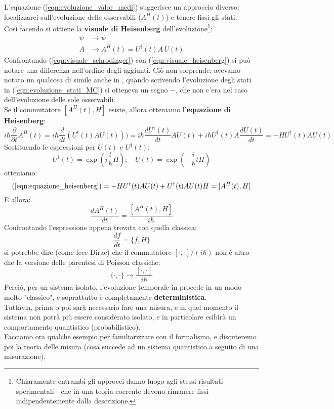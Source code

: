 \documentclass[../../FisicaTeorica.tex]{subfiles}
\begin{document}
L'equazione (\ref{eqn:evoluzione_valor_medi}) suggerisce un approccio diverso: focalizzarci sull'evoluzione delle osservabili ($A^H(t)$) e tenere fissi gli stati.\\
Così facendo si ottiene la \textbf{visuale di Heisenberg} dell'evoluzione\footnote{Chiaramente entrambi gli approcci danno luogo agli stessi risultati sperimentali - che in una teoria coerente devono rimanere fissi indipendentemente dalla descrizione.}:
\begin{align}
    \psi &\to \psi
    \label{eqn:visuale_heisenberg}
    \\
    A &\to A^H(t)=U^\dag (t)A\,U(t)
    \nonumber
\end{align}
Confrontando (\ref{eqn:visuale_schrodinger}) con (\ref{eqn:visuale_heisenberg}) si può notare una differenza nell'ordine degli aggiunti. Ciò non sorprende: avevamo notato un qualcosa di simile anche in \MC, quando scrivendo l'evoluzione degli stati in (\ref{eqn:evoluzione_stati_MC}) si otteneva un segno $-$, che non c'era nel caso dell'evoluzione delle sole osservabili.\\
Se il commutatore $[A^H(t), H]$ esiste, allora otteniamo l'\textbf{equazione di Heisenberg}:
\begin{equation}
i\hbar \frac{\partial}{\partial t}A^H(t) = i\hbar \frac{d}{dt}(U^t(t)AU(t))
) = i\hbar \frac{dU^\dag(t)}{dt}AU(t)+i\hbar U^\dag(t)A\frac{dU(t)}{dt} = -HU^\dag(t)AU(t)
\label{eqn:equazione_heisenberg}
\end{equation}
Sostituendo le espressioni per $U(t)$ e $U^\dag(t)$:
\[
U^\dag(t)=\exp\left(i\frac{t}{\hbar}H\right); \quad U(t)=\exp\left(-\frac{i}{\hbar}tH\right)
\]
otteniamo:
\[
(\ref{eqn:equazione_heisenberg}) = -HU^\dag(t)AU(t)+U^\dag(t)AU(t)H=[A^H(t),H]
\]
E allora:
\[
\frac{dA^H(t)}{dt}=\frac{[A^H(t),H]}{i\hbar}
\]
Confrontando l'espressione appena trovata con quella classica:
\[
\frac{df}{dt}=\{f,H\}
\]
si potrebbe dire (come fece Dirac) che il commutatore $[\cdot,\cdot]/(i\hbar)$ non è altro che la versione  delle parentesi di Poisson classiche:
\[
\{\cdot,\cdot\} \to \frac{[\cdot,\cdot]}{i\hbar}
\]
Perciò, per un sistema isolato, l'evoluzione temporale in \MQ procede in un modo molto "classico", e soprattutto è completamente \textbf{deterministica}.\\
Tuttavia, prima o poi sarà necessario fare una misura, e in quel momento il sistema non potrà più essere considerato isolato, e in particolare esibirà un comportamento quantistico (probabilistico).\\
Facciamo ora qualche esempio per familiarizzare con il formalismo, e discuteremo poi la teoria delle misura (cosa succede ad un sistema quantistico a seguito di una misurazione).\\
\end{document}
